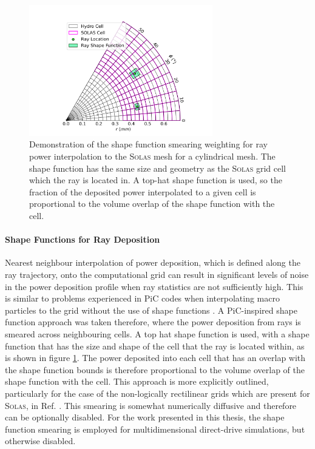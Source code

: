 \begin{figure}[t!]
    \includegraphics[width=8.0cm]{Numerics/Images/SOLAS_ray_shape_functions.png}
    \centering
    \caption{Demonstration of the shape function smearing weighting for ray power interpolation to the \textsc{Solas} mesh for a cylindrical mesh.
    The shape function has the same size and geometry as the \textsc{Solas} grid cell which the ray is located in.
    A top-hat shape function is used, so the fraction of the deposited power interpolated to a given cell is proportional to the volume overlap of the shape function with the cell.}
    \label{fig:SOLAS_ray_shapefunction}
\end{figure}

\paragraph*{Shape Functions for Ray Deposition}
Nearest neighbour interpolation of power deposition, which is defined along the ray trajectory, onto the computational grid can result in significant levels of noise in the power deposition profile when ray statistics are not sufficiently high.
This is similar to problems experienced in \ac{PiC} codes when interpolating macro particles to the grid without the use of shape functions \cite{birdsall_plasma_1985,arber_contemporary_2015}.
A \ac{PiC}-inspired shape function approach was taken therefore, where the power deposition from rays is smeared across neighbouring cells.
A top hat shape function is used, with a shape function that has the size and shape of the cell that the ray is located within, as is shown in figure \ref{fig:SOLAS_ray_shapefunction}.
The power deposited into each cell that has an overlap with the shape function bounds is therefore proportional to the volume overlap of the shape function with the cell.
This approach is more explicitly outlined, particularly for the case of the non-logically rectilinear grids which are present for \textsc{Solas}, in Ref. \cite{cornet_new_2007}.
This smearing is somewhat numerically diffusive and therefore can be optionally disabled.
For the work presented in this thesis, the shape function smearing is employed for multidimensional direct-drive simulations, but otherwise disabled.

